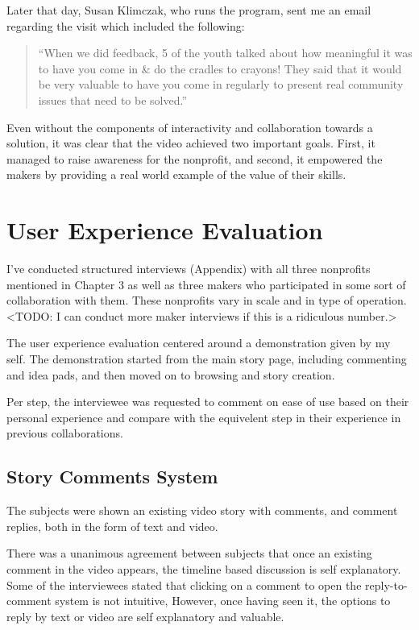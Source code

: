 Later that day, Susan Klimczak, who runs the program, sent me an email regarding the visit which included the following:

\begin{quotation}

``When we did feedback, 5 of the youth talked about how meaningful it was to have you come in \& do the cradles to crayons! They said that it would be very valuable to have you come in regularly to present real community issues that need to be solved.''

\end{quotation}

Even without the components of interactivity and collaboration towards a solution, it was clear that the video achieved two important goals. First, it managed to raise awareness for the nonprofit, and second, it empowered the makers by providing a real world example of the value of their skills.

\section{User Experience Evaluation}

I've conducted structured interviews (Appendix) with all three nonprofits mentioned in Chapter 3 as well as three makers who participated in some sort of collaboration with them. These nonprofits vary in scale and in type of operation. <TODO: I can conduct more maker interviews if this is a ridiculous number.>

The user experience evaluation centered around a demonstration given by my self. The demonstration started from the main story page, including commenting and idea pads, and then moved on to browsing and story creation. 

Per step, the interviewee was requested to comment on ease of use based on their personal experience and compare with the equivelent step in their experience in previous collaborations. 

\subsection{Story Comments System}

The subjects were shown an existing video story with comments, and comment replies, both in the form of text and video.

There was a unanimous agreement between subjects that once an existing comment in the video appears, the timeline based discussion is self explanatory. Some of the interviewees stated that clicking on a comment to open the reply-to-comment system is not intuitive, However, once having seen it, the options to reply by text or video are self explanatory and valuable.

